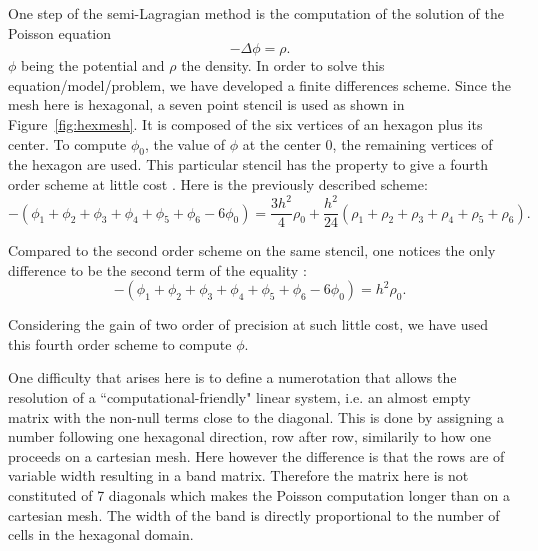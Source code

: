 \documentclass[proc]{edpsmath}
\begin{document}
One step of the semi-Lagragian method is the computation of the solution of the Poisson equation
\begin{equation*}
	- \Delta \phi = \rho .
\end{equation*}
 $\phi$ being the potential and $\rho$ the density.
 In order to solve this equation/model/problem, we have developed a finite differences scheme. Since the mesh here is hexagonal, a seven point stencil is used as shown in Figure~\ref{fig:hexmesh}. It is composed of the six vertices of an hexagon plus its center. To compute  $\phi_0$, the value of $\phi$ at the center $0$,  the remaining vertices of the hexagon are used. 
 This particular stencil has the property to give a fourth order scheme at little cost \cite{poisson}. Here is the previously described scheme:
\begin{equation*}
-(\phi_1 + \phi_2 + \phi_3 + \phi_4 +\phi_5 + \phi_6 - 6 \phi_0)  = \frac{3h^2}{4} \rho_0 + \frac{h^2}{24}(\rho_1+\rho_2+\rho_3+\rho_4+\rho_5+\rho_6).
\end{equation*} 

Compared to the second order scheme on the same stencil, one notices the only difference to be the second term of the equality :  
\begin{equation*}
-(\phi_1 + \phi_2 + \phi_3 + \phi_4 +\phi_5 + \phi_6 - 6 \phi_0)  = h^2 \rho_0.
\end{equation*} 

Considering the gain of two order of precision at such little cost, we have used this fourth order scheme to compute $\phi$.

 \rmrk One difficulty that arises here is to define a numerotation that allows the resolution of a ``computational-friendly" linear system, i.e. an almost empty matrix with the non-null terms close to the diagonal. This is done by assigning a number following one hexagonal direction, row after row, similarily to how one proceeds on a cartesian mesh. Here however the difference is that the rows are of variable width resulting in a band matrix. Therefore the matrix here is not constituted of 7 diagonals which makes the Poisson computation longer than on a cartesian mesh. The width of the band is directly proportional to the number of cells in the hexagonal domain.  

\end{document}
